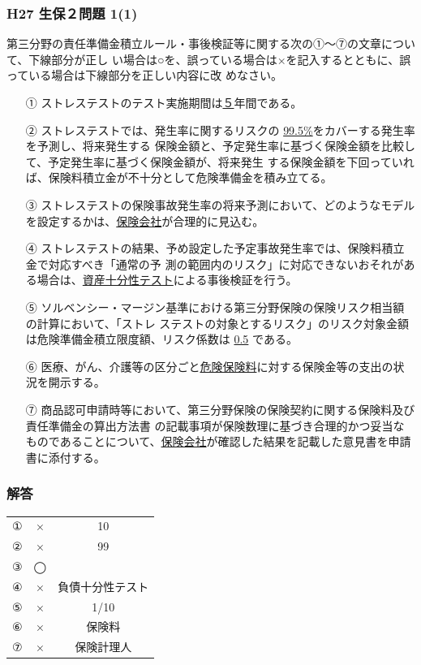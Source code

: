 \documentclass[report,gutter=10mm,fore-edge=10mm,uplatex,dvipdfmx]{jlreq}
\begin{document}
\subsubsection{H27 生保２問題 1(1)}
第三分野の責任準備金積立ルール・事後検証等に関する次の①～⑦の文章について、下線部分が正し
い場合は○を、誤っている場合は×を記入するとともに、誤っている場合は下線部分を正しい内容に改
めなさい。
\begin{itemize}
 \item [①] ストレステストのテスト実施期間は\underline{５}年間である。
 \item [②] ストレステストでは、発生率に関するリスクの \underline{99.5\%}をカバーする発生率を予測し、将来発生する
保険金額と、予定発生率に基づく保険金額を比較して、予定発生率に基づく保険金額が、将来発生
する保険金額を下回っていれば、保険料積立金が不十分として危険準備金を積み立てる。
 \item [③] ストレステストの保険事故発生率の将来予測において、どのようなモデルを設定するかは、\underline{保険会社}が合理的に見込む。
 \item [④] ストレステストの結果、予め設定した予定事故発生率では、保険料積立金で対応すべき「通常の予
測の範囲内のリスク」に対応できないおそれがある場合は、\underline{資産十分性テスト}による事後検証を行う。
 \item [⑤] ソルベンシー・マージン基準における第三分野保険の保険リスク相当額の計算において、「ストレ
ステストの対象とするリスク」のリスク対象金額は危険準備金積立限度額、リスク係数は \underline{0.5} である。
 \item [⑥] 医療、がん、介護等の区分ごと\underline{危険保険料}に対する保険金等の支出の状況を開示する。
 \item [⑦] 商品認可申請時等において、第三分野保険の保険契約に関する保険料及び責任準備金の算出方法書
の記載事項が保険数理に基づき合理的かつ妥当なものであることについて、\underline{保険会社}が確認した結果を記載した意見書を申請書に添付する。

\end{itemize}
\subsubsection{解答}

\begin{tabular}{|c|c|c|}
 ①&× & 10 \\
 ②&×& 99\\
 ③&◯& \\
 ④&×& 負債十分性テスト\\
 ⑤&× & 1/10 \\
 ⑥&× & 保険料 \\
 ⑦&× & 保険計理人 \\
\end{tabular}
\end{document}
